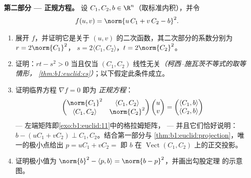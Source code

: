 \begin{problem}
\medskip
\noindent\textbf{第二部分 --- 正规方程。} 设 $C_1,
C_2, b \in \R^n$（取标准内积），并令
\[
f(u, v) = \norm{u\,C_1 + v\,C_2 - b}^2 .
\]
\begin{enumerate}[resume]
  \item 展开 $f$，并证明它是关于 $(u,
        v)$ 的二次函数，其二次部分的系数分别为 $r = 2\norm{C_1}^2$，
        $s = 2\langle C_1, C_2\rangle$，$t = 2\norm{C_2}^2$。
  \item 证明：$rt - s^2 > 0$ 当且仅当 $(C_1, C_2)$
        线性无关\emph{（柯西–施瓦茨不等式的取等情形，
        \cref{thm:b1:euclid:cs}）}；以下假定此条件成立。
  \item 证明临界方程 $\nabla f = 0$ 即为
        \emph{正规方程}：
        \[
        \begin{pmatrix}
        \norm{C_1}^2 & \langle C_1, C_2\rangle\\
        \langle C_1, C_2\rangle & \norm{C_2}^2
        \end{pmatrix}
        \begin{pmatrix} u\\ v\end{pmatrix}
        =
        \begin{pmatrix} \langle C_1, b\rangle\\ \langle C_2,
        b\rangle\end{pmatrix}
        \]
        --- 左端矩阵即\cref{exo:b1:euclid:11}中的格拉姆矩阵，
        --- 并且它们恰好说明：$b - (uC_1 + vC_2)
        \perp C_1, C_2$。结合第一部分与
        \cref{thm:b1:euclid:projection}，唯一的极小点给出
        $p = uC_1 + vC_2 =$ 即
        $b$ 在 $\operatorname{Vect}(C_1, C_2)$ 上的正交投影。
  \item 证明极小值为 $\norm{b}^2 - \langle p,
        b\rangle = \norm{b - p}^2$，并画出勾股定理
        的示意图。
\end{enumerate}


\end{problem}

